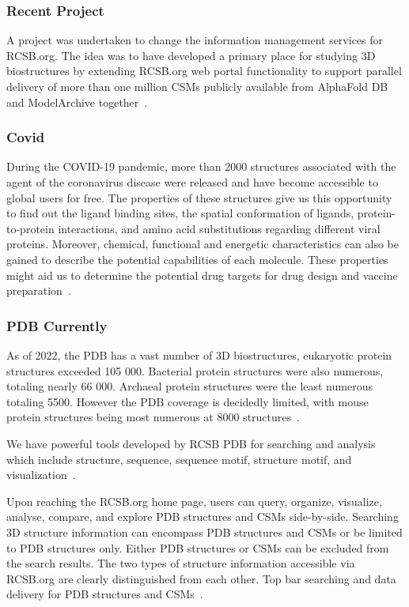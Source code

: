 \documentclass[]{final_report}
\begin{document}
\subsubsection{Recent Project}

A project was undertaken to change the information management services for RCSB.org. The idea was to have developed a primary place for studying 3D biostructures by extending RCSB.org web portal functionality to support parallel delivery of more than one million CSMs publicly available from AlphaFold DB and ModelArchive together~\cite{burley1_rcsb_2022}.

\subsubsection{Covid}

During the COVID-19 pandemic, more than 2000 structures associated with the agent of the coronavirus disease were released and have become accessible to global users for free. The properties of these structures give us this opportunity to find out the ligand binding sites, the spatial conformation of ligands, protein-to-protein interactions, and amino acid substitutions regarding different viral proteins. Moreover, chemical, functional and energetic characteristics can also be gained to describe the potential capabilities of each molecule. These properties might aid us to determine the potential drug targets for drug design and vaccine preparation~\cite{lubin_evolution_2020}.

\subsubsection{PDB Currently}

As of 2022, the PDB has a vast number of 3D biostructures, eukaryotic protein structures exceeded 105 000. Bacterial protein structures were also numerous, totaling nearly 66 000. Archaeal protein structures were the least numerous totaling 5500. However the PDB coverage is decidedly limited, with mouse protein structures being most numerous at 8000 structures~\cite{burley_open-access_2021}. 

We have powerful tools developed by RCSB PDB for searching and analysis which include structure, sequence, sequence motif, structure motif, and visualization~\cite{burley1_rcsb_2022}.

Upon reaching the RCSB.org home page, users can query, organize, visualize, analyse, compare, and explore PDB structures and CSMs side-by-side. Searching 3D structure information can encompass PDB structures and CSMs or be limited to PDB structures only. Either PDB structures or CSMs can be excluded from the search results. The two types of structure information accessible via RCSB.org are clearly distinguished from each other. Top bar searching and data delivery for PDB structures and CSMs~\cite{burley1_rcsb_2022}.
\end{document}
